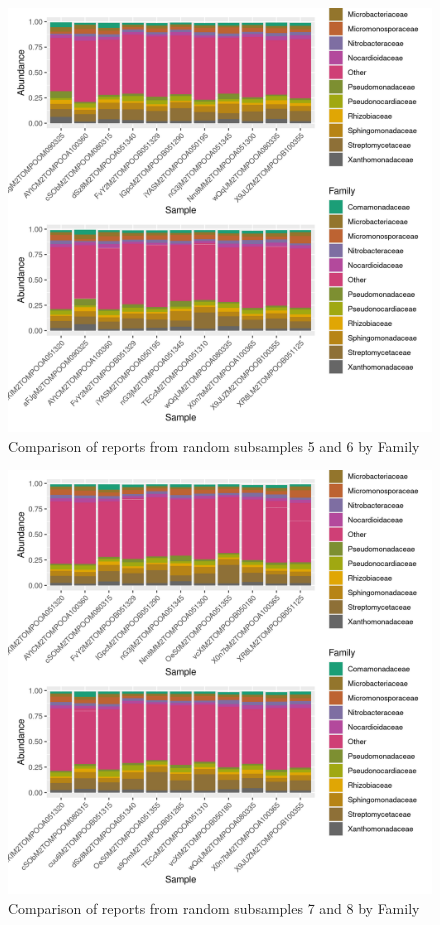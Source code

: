 \documentclass{article}
\begin{document}
\begin{figure}
\centering
\includegraphics[scale=0.8]{tomate_aleatorio1_5.csv_tomate_aleatorio1_6.csv_relative_abundance_Family.png}
\caption{Comparison of reports from random subsamples 5 and 6 by Family}
\end{figure}


\begin{figure}
\centering
\includegraphics[scale=0.8]{tomate_aleatorio1_7.csv_tomate_aleatorio1_8.csv_relative_abundance_Family.png}
\caption{Comparison of reports from random subsamples 7 and 8 by Family}
\end{figure}
\end{document}
